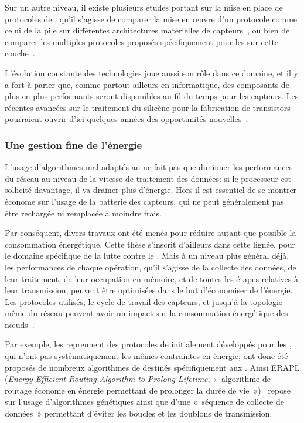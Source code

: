 Sur un autre niveau, il existe plusieurs études portant sur la mise en place de protocoles de , qu'il s'agisse de comparer la mise en œuvre d'un protocole comme celui de la pile \ieeeff sur différentes architectures matérielles de capteurs~\cite{BPCCGF07}, ou bien de comparer les multiples protocoles proposés spécifiquement pour les \rcs sur cette couche~\cite{YB09}.

L'évolution constante des technologies joue aussi son rôle dans ce domaine, et il y a fort à parier que, comme partout ailleurs en informatique, des composants de plus en plus performants seront disponibles au fil du temps pour les capteurs.
Les récentes avancées sur le traitement du silicène pour la fabrication de transistors pourraient ouvrir d'ici quelques années des opportunités nouvelles~\cite{TCCGFDMA15}.

        \subsubsection{Une gestion fine de l'énergie}
L'usage d'algorithmes mal adaptés au \rcs ne fait pas que diminuer les performances du réseau au niveau de la vitesse de traitement des données: si le processeur est sollicité davantage, il va drainer plus d'énergie.
Hors il est essentiel de se montrer économe sur l'usage de la batterie des capteurs, qui ne peut généralement pas être rechargée ni remplacée à moindre frais.

Par conséquent, divers travaux ont été menés pour réduire autant que possible la consommation énergétique.
Cette thèse s'inscrit d'ailleurs dans cette lignée, pour le domaine spécifique de la lutte contre le \dds.
Mais à un niveau plus général déjà, les performances de chaque opération, qu'il s'agisse de la collecte des données, de leur traitement, de leur occupation en mémoire, et de toutes les étapes relatives à leur transmission, peuvent être optimisées dans le but d'économiser de l'énergie.
Les protocoles utilisés, le cycle de travail des capteurs, et jusqu'à la topologie même du réseau peuvent avoir un impact sur la consommation énergétique des nœuds~\cite{ACFP09}.

Par exemple, les \rcs reprennent des protocoles de  initialement développés pour les , qui n'ont pas systématiquement les mêmes contraintes en énergie; ont donc été proposés de nombreux algorithmes de  destinés spécifiquement aux \rcs.
Ainsi ERAPL (\textit{Energy-Efficient Routing Algorithm to Prolong Lifetime}, « algorithme de routage économe en énergie permettant de prolonger la durée de vie »)~\cite{ZWPT10} repose sur l'usage d'algorithmes génétiques ainsi que d'une « séquence de collecte de données » permettant d'éviter les boucles et les doublons de transmission.

